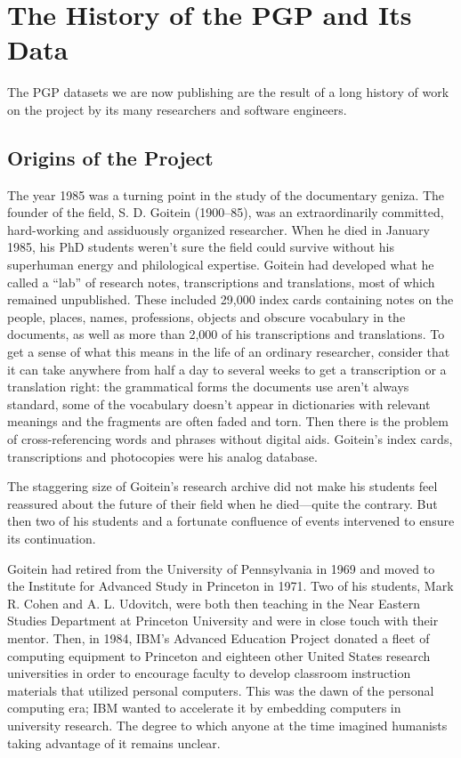 \documentclass{article}
\begin{document}
\section{The History of the PGP and Its Data}

The PGP datasets we are now publishing are the result of a long history of work on the project by its many researchers and software engineers.

\subsection{Origins of the Project}

The year 1985 was a turning point in the study of the documentary geniza. The founder of the field, S. D. Goitein (1900–85), was an extraordinarily committed, hard-working and assiduously organized researcher. When he died in January 1985, his PhD students weren’t sure the field could survive without his superhuman energy and philological expertise. Goitein had developed what he called a “lab” of research notes, transcriptions and translations, most of which remained unpublished. These included 29,000 index cards containing notes on the people, places, names, professions, objects and obscure vocabulary in the documents, as well as more than 2,000 of his transcriptions and translations. To get a sense of what this means in the life of an ordinary researcher, consider that it can take anywhere from half a day to several weeks to get a transcription or a translation right: the grammatical forms the documents use aren’t always standard, some of the vocabulary doesn’t appear in dictionaries with relevant meanings and the fragments are often faded and torn. Then there is the problem of cross-referencing words and phrases without digital aids. Goitein’s index cards, transcriptions and photocopies were his analog database. 

The staggering size of Goitein’s research archive did not make his students feel reassured about the future of their field when he died—quite the contrary. But then two of his students and a fortunate confluence of events intervened to ensure its continuation. 

Goitein had retired from the University of Pennsylvania in 1969 and moved to the Institute for Advanced Study in Princeton in 1971. Two of his students, Mark R. Cohen and A. L. Udovitch, were both then teaching in the Near Eastern Studies Department at Princeton University and were in close touch with their mentor. Then, in 1984, IBM’s Advanced Education Project donated a fleet of computing equipment to Princeton and eighteen other United States research universities in order to encourage faculty to develop classroom instruction materials that utilized personal computers. This was the dawn of the personal computing era; IBM wanted to accelerate it by embedding computers in university research. The degree to which anyone at the time imagined humanists taking advantage of it remains unclear.
\end{document}
